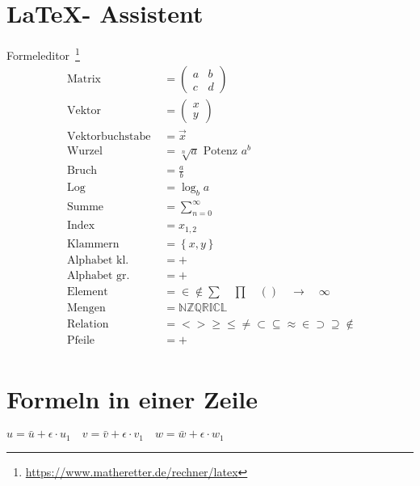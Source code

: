 \section{\LaTeX - Assistent}
    Formeleditor~\footnote{\url{https://www.matheretter.de/rechner/latex}}
    \begin{align}
        \text{ Matrix }       &= \begin{pmatrix} a & b \\ c & d \end{pmatrix} \\
        \text{ Vektor }       &= \begin{pmatrix} x\\y \end{pmatrix} \\
        \text{ Vektorbuchstabe } &= \vec{x} \\
        \text{ Wurzel }       &= \sqrt[n]{a} \text{ Potenz } a^{b} \\
        \text{ Bruch }        &= \frac{a}{b} \\
        \text{ Log }          &= \log_{b}{a} \\
        \text{ Summe }        &= \sum \limits_{n=0}^{\infty} \\
        \text{ Index }        &= x_{1,2} \\
        \text{ Klammern }     &= \left\{x, y\right\} \\
        \text{ Alphabet kl. } &= +\\%
        \text{ Alphabet gr. } &= +\\%
        \text{ Element }      &= \in \notin \sum \quad \prod \quad () \quad \to \quad \infty\\
        \text{ Mengen }       &= \mathbb{N} \mathbb{Z} \mathbb{Q} \mathbb{R} \mathbb{I} \mathbb{C} \mathbb{L} \\
        \text{ Relation }     &= < > \geq \leq \neq \subset \subseteq \approx \in \supset \supseteq \notin \\
        \text{ Pfeile }       &= +\\%
    \end{align}

\section{Formeln in einer Zeile}
    $
        u = \bar{u} + \epsilon \cdot u_1 \quad
        v = \bar{v} + \epsilon \cdot v_1 \quad
        w = \bar{w} + \epsilon \cdot w_1 \quad
    $

